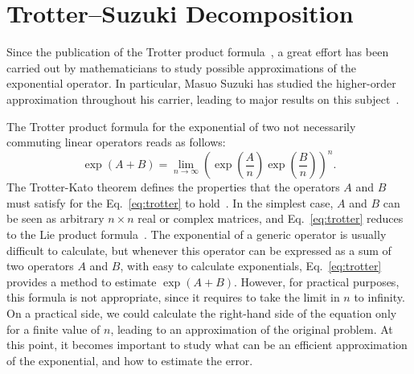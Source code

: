 \chapter{Trotter--Suzuki Decomposition}
Since the publication of the Trotter product formula~\cite{trotter1959product}, a great effort has been carried out by mathematicians to study possible approximations of the exponential operator. In particular, Masuo Suzuki has studied the higher-order approximation throughout his carrier, leading to major results on this subject~\cite{suzuki1985decomposition,suzuki1990fractal,Suzuki1992387, suzuki1994quantum,Suzuki1995425,suzuki1997algebraic,Suzuki200032}.

The Trotter product formula for the exponential of two not necessarily commuting linear operators reads as follows:
\begin{equation} \label{eq:trotter}
\exp{(A+B)} = \lim_{n\rightarrow\infty} \left(\exp\left({\frac{A}{n}}\right) \exp{\left(\frac{B}{n}\right)}\right)^n.
\end{equation}
The Trotter-Kato theorem defines the properties that the operators $A$ and $B$ must satisfy for the Eq.~\eqref{eq:trotter} to hold~\cite{KatoTosio1978}. In the simplest case, $A$ and $B$ can be seen as arbitrary $n\times n$ real or complex matrices, and  Eq.~\eqref{eq:trotter} reduces to the Lie product formula~\cite{SophusLie1888}. The exponential of a generic operator is usually difficult to calculate, but whenever this operator can be expressed as a sum of two operators $A$ and $B$, with easy to calculate exponentials, Eq.~\eqref{eq:trotter} provides a method to estimate $\exp{(A+B)}$. However, for practical purposes, this formula is not appropriate, since it requires to take the limit in $n$ to infinity. On a practical side, we could calculate the right-hand side of the equation only for a finite value of $n$, leading to an approximation of the original problem. At this point, it becomes important to study what can be an efficient approximation of the exponential, and how to estimate the error.

